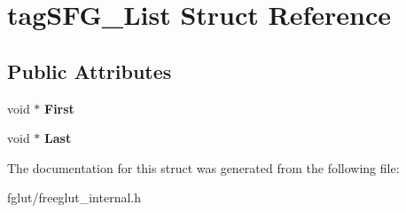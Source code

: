 \hypertarget{structtag_s_f_g___list}{}\section{tag\+S\+F\+G\+\_\+\+List Struct Reference}
\label{structtag_s_f_g___list}
\subsection*{Public Attributes}
\begin{DoxyCompactItemize}
\item 
void $\ast$ {\bfseries First}\hypertarget{structtag_s_f_g___list_a3674656933639d5ab8ce2eceb38e2378}{}\label{structtag_s_f_g___list_a3674656933639d5ab8ce2eceb38e2378}

\item 
void $\ast$ {\bfseries Last}\hypertarget{structtag_s_f_g___list_afbc088eaa22b0777903f6f81dbd497dc}{}\label{structtag_s_f_g___list_afbc088eaa22b0777903f6f81dbd497dc}

\end{DoxyCompactItemize}


The documentation for this struct was generated from the following file\+:\begin{DoxyCompactItemize}
\item 
fglut/freeglut\+\_\+internal.\+h\end{DoxyCompactItemize}
